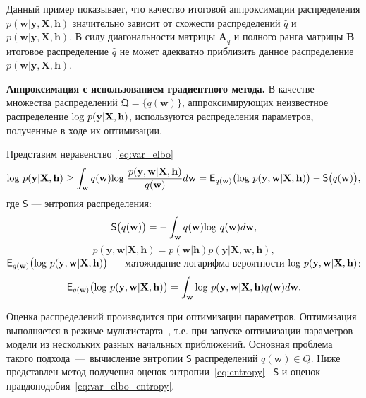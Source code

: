 \begin{example}
{Данный пример показывает, что качество итоговой аппроксимации распределения $p(\mathbf{w}|\mathbf{y}, \mathbf{X}, \mathbf{h})$ значительно зависит от схожести распределений $\hat{q}$ и $p(\mathbf{w}|\mathbf{y}, \mathbf{X}, \mathbf{h})$. В силу диагональности матрицы $\mathbf{A}_q$ и полного ранга матрицы $\mathbf{B}$  итоговое распределение $\hat{q}$ не может адекватно приблизить данное распределение  $p(\mathbf{w}|\mathbf{y}, \mathbf{X}, \mathbf{h})$.}

\end{example}

\textbf{Аппроксимация с использованием градиентного метода. }
В качестве множества распределений $\mathfrak{Q} = \{q(\mathbf{w})\}$, аппроксимирующих неизвестное распределение $\textnormal{log}~p(\mathbf{y}|\mathbf{X},\mathbf{h})$, используются распределения параметров, полученные в ходе их оптимизации.

Представим неравенство~\eqref{eq:var_elbo}
\begin{equation}
\label{eq:var_elbo_entropy}
 \textnormal{log}~p(\mathbf{y}|\mathbf{X},\mathbf{h}) \geq \int_\mathbf{w} q(\mathbf{w})\textnormal{log}~\frac{p(\mathbf{y},\mathbf{w}|\mathbf{X}, \mathbf{h})}{q(\mathbf{w})}d\mathbf{w} =  \mathsf{E}_{q(\mathbf{w)}}\bigl(\textnormal{log~}p (\mathbf{y}, \mathbf{w}|\mathbf{X}, \mathbf{h})\bigr) - \mathsf{S}\bigl({q(\mathbf{w)}}\bigr),
\end{equation}
где $\mathsf{S}$ --- энтропия распределения:
\[
\mathsf{S}\bigl({q(\mathbf{w)}}\bigr) = - \int_{\mathbf{w}} q(\mathbf{w})\textnormal{log}~q(\mathbf{w})d\mathbf{w},
\]
$$p (\mathbf{y}, \mathbf{w}|\mathbf{X}, \mathbf{h}) = p (\mathbf{w}| \mathbf{h}) p (\mathbf{y}|\mathbf{X}, \mathbf{w}, \mathbf{h}),$$
$\mathsf{E}_{q(\mathbf{w)}}\bigl(\textnormal{log~}p (\mathbf{y}, \mathbf{w}|\mathbf{X}, \mathbf{h})\bigr)$ --- матожидание логарифма вероятности $\textnormal{log~}p (\mathbf{y}, \mathbf{w}|\mathbf{X}, \mathbf{h})$:
\[
	\mathsf{E}_{q(\mathbf{w)}}\bigl(\textnormal{log~}p (\mathbf{y}, \mathbf{w}|\mathbf{X}, \mathbf{h})\bigr) = \int_\mathbf{w} \textnormal{log~}p (\mathbf{y}, \mathbf{w}|\mathbf{X}, \mathbf{h}) q(\mathbf{w}) d\mathbf{w}.
\]

Оценка распределений производится при оптимизации параметров. Оптимизация выполняется в режиме мультистарта~\cite{multi}, т.е. при запуске оптимизации параметров модели из нескольких разных начальных приближений. Основная проблема такого подхода~---~вычисление энтропии $\mathsf{S}$ распределений $q(\mathbf{w}) \in Q$. Ниже представлен метод получения оценок энтропии~\eqref{eq:entropy} ~$\mathsf{S}$ и оценок правдоподобия~\eqref{eq:var_elbo_entropy}.

